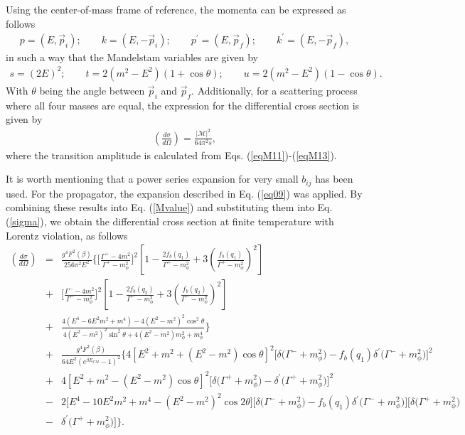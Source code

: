 \documentclass[11pt,showpacs,preprintnumbers,amsmath,amssymb,prd,nofootinbib,superscriptaddress]{revtex4-2}
\begin{document}
{ Using the center-of-mass frame of reference, the momenta can be expressed as follows
\begin{eqnarray}p=(E,\vec{p}_i);\quad\quad k=(E,-\vec{p}_i);\quad\quad p^\prime=(E,\vec{p}_f);\quad\quad k^\prime=(E,-\vec{p}_f),\end{eqnarray}
in such a way that the Mandelstam variables are given by
\begin{eqnarray}s=(2E)^2;\quad\quad t=2(m^2-E^2)(1+\cos{\theta});\quad\quad u=2(m^2-E^2)(1-\cos{\theta}).\end{eqnarray}
With $\theta$ being the angle between $\vec{p}_i$ and $\vec{p}_f$. Additionally, for a scattering process where all four masses are equal, the expression for the differential cross section is given by \cite{peskin}
\begin{eqnarray}\left(\frac{d\sigma}{d\Omega}\right)=\frac{|\mathcal{M}|^2}{64\pi^2 s},\label{sigma}
\end{eqnarray}
where the transition amplitude is calculated from Eqs. (\ref{eqM11})-(\ref{eqM13}).

It is worth mentioning that a power series expansion for very small $b_{ij}$ has been used. For the propagator, the expansion described in Eq. (\ref{eq09}) was applied. By combining these results into Eq. (\ref{Mvalue}) and substituting them into Eq. (\ref{sigma}), we obtain the differential cross section at finite temperature with Lorentz violation, as follows
{\color{red} \begin{eqnarray}\left(\frac{d\sigma}{d\Omega}\right)&=&\frac{g^4F^2(\beta)}{256\pi^2 E^2}\Bigg\{\biggl[\frac{\Gamma^{+}-4m^2}{\Gamma^{+}-m_\phi^2}\biggr]^2\left[1-\frac{2f_b(q_1)}{\Gamma^{+}-m_\phi^2}+3\left(\frac{f_b(q_1)}{\Gamma^{+}-m_\phi^2}\right)^2\right]\nonumber\\&+&\biggl[\frac{\Gamma^{-}-4m^2}{\Gamma^{-}-m_\phi^2}\biggr]^2\left[1-\frac{2f_b(q_2)}{\Gamma^{-}-m_\phi^2}+3\left(\frac{f_b(q_2)}{\Gamma^{-}-m_\phi^2}\right)^2\right]\nonumber\\&+&\frac{4(E^4-6E^2m^2+m^4)-4(E^2-m^2)^2\cos^2{\theta}}{4(E^2-m^2)^2\sin^2{\theta}+4(E^2-m^2)m_\phi^2+m_\phi^4}\Bigg\}\nonumber\\&+&\frac{g^4F^2(\beta)}{64E^2(e^{\beta E_{CM}}-1)^2}\biggl\{4\left[E^2+m^2+(E^2-m^2)\cos{\theta}\right]^2\biggl[\delta\biggl(\Gamma^{-}+m_\phi^2\biggr)-f_b(q_1)\delta^\prime\biggl(\Gamma^{-}+m_\phi^2\biggr)\biggr]^2\nonumber\\&+&4\left[E^2+m^2-(E^2-m^2)\cos{\theta}\right]^2\biggl[\delta\biggl(\Gamma^{+}+m_\phi^2\biggr)-\delta^\prime\biggl(\Gamma^{+}+m_\phi^2\biggr)\biggr]^2\nonumber\\&-&2\biggl[E^4-10E^2m^2+m^4-(E^2-m^2)^2\cos{2\theta}\biggr]\biggl[\delta\biggl(\Gamma^{-}+m_\phi^2\biggr)-f_b(q_1)\delta^\prime\biggl(\Gamma^{-}+m_\phi^2\biggr)\biggr]\biggl[\delta\biggl(\Gamma^{+}+m_\phi^2\biggr)\nonumber\\&-&\delta^\prime\biggl(\Gamma^{+}+m_\phi^2\biggr)\biggr]\biggr\}.\label{eq22}
\end{eqnarray}}

}
\end{document}
